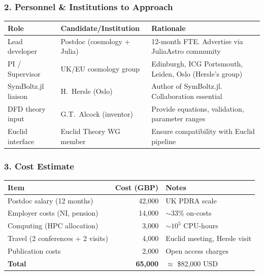 \documentclass[11pt,a4paper]{article}
\begin{document}
\subsubsection{2. Personnel \& Institutions to Approach}

\begin{center}
\begin{longtable}{p{3.5cm}p{4cm}p{5cm}}
\toprule
\textbf{Role} & \textbf{Candidate/Institution} & \textbf{Rationale} \\
\midrule
\endfirsthead
Lead developer & Postdoc (cosmology + Julia) & 12-month FTE. Advertise via JuliaAstro community \\
PI / Supervisor & UK/EU cosmology group & Edinburgh, ICG Portsmouth, Leiden, Oslo (Hersle's group) \\
SymBoltz.jl liaison & H.~Hersle (Oslo) & Author of SymBoltz.jl. Collaboration essential \\
DFD theory input & G.T.~Alcock (inventor) & Provide equations, validation, parameter ranges \\
Euclid interface & Euclid Theory WG member & Ensure compatibility with Euclid pipeline \\
\bottomrule
\end{longtable}
\end{center}

\subsubsection{3. Cost Estimate}

\begin{center}
\begin{tabular}{lrl}
\toprule
\textbf{Item} & \textbf{Cost (GBP)} & \textbf{Notes} \\
\midrule
Postdoc salary (12 months) & 42,000 & UK PDRA scale \\
Employer costs (NI, pension) & 14,000 & $\sim$33\% on-costs \\
Computing (HPC allocation) & 3,000 & $\sim 10^5$ CPU-hours \\
Travel (2 conferences + 2 visits) & 4,000 & Euclid meeting, Hersle visit \\
Publication costs & 2,000 & Open access charges \\
\midrule
\textbf{Total} & \textbf{65,000} & $\approx$ \$82,000 USD \\
\bottomrule
\end{tabular}
\end{center}
\end{document}
